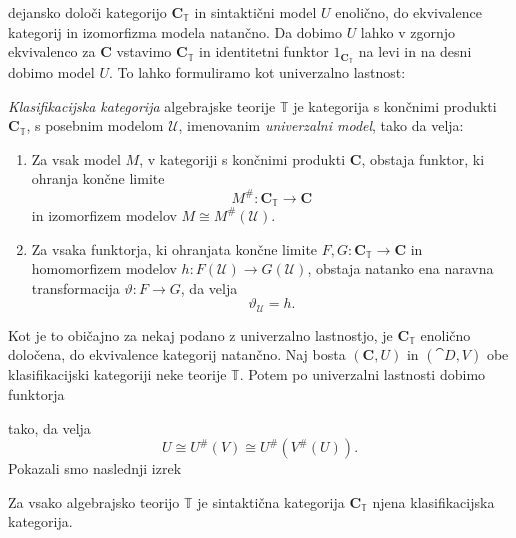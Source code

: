 \documentclass[../kategoricna_logika.tex]{subfiles}
\begin{document}
dejansko določi kategorijo $\mathbf{C}_{\mathbb{T}}$ in sintaktični model $U$ enolično,
do ekvivalence kategorij in izomorfizma modela natančno.
Da dobimo $U$ lahko v zgornjo ekvivalenco za $\mathbf{C}$ vstavimo $\mathbf{C}_{\mathbb{T}}$
in identitetni funktor $1_{\mathbf{C}_{\mathbb{T}}}$ na levi in na desni dobimo
model $U$. To lahko formuliramo kot univerzalno lastnost:
\begin{definicija}
  \emph{Klasifikacijska kategorija} algebrajske teorije $\mathbb{T}$
  je kategorija s končnimi produkti $\mathbf{C}_\mathbb{T}$, s
  posebnim modelom $\mathcal{U}$, imenovanim \emph{univerzalni model},
  tako da velja:
  \begin{enumerate}
  \item Za vsak model $M$, v kategoriji s končnimi produkti
    $\mathbf{C}$, obstaja funktor, ki ohranja končne limite
    $$M^{\#} : \mathbf{C}_\mathbb{T} \to \mathbf{C}$$ in izomorfizem
    modelov $M \cong M^{\#}(\mathcal{U})$.
%
  \item Za vsaka funktorja, ki ohranjata končne limite
    $F,G : \mathbf{C}_\mathbb{T} \to \mathbf{C}$ in homomorfizem
    modelov $h: F(\mathcal{U}) \to G(\mathcal{U})$, obstaja natanko
    ena naravna transformacija $\vartheta : F \to G$, da velja
$$\vartheta_\mathcal{U} = h.$$
\end{enumerate}
\end{definicija}
Kot je to običajno za nekaj podano z univerzalno lastnostjo,
je $\mathbf{C}_\mathbb{T}$ enolično določena, do ekvivalence kategorij natančno.
%
Naj bosta $(\mathbf{C}, U)$ in $(\cat{D}, V)$ obe klasifikacijski
kategoriji neke teorije $\mathbb{T}$. Potem po univerzalni lastnosti
dobimo funktorja
\begin{center}
\end{center}
tako, da velja
$$U \cong U^{\#}(V) \cong U^{\#}(V^{\#}(U)).$$
Pokazali smo naslednji izrek
\begin{izrek}
\label{sec:klasifikacijska-kategorija-alg-teorije}
Za vsako algebrajsko teorijo $\mathbb{T}$ je sintaktična kategorija $\mathbf{C}_{\mathbb{T}}$
njena klasifikacijska kategorija.
\end{izrek}
\end{document}
